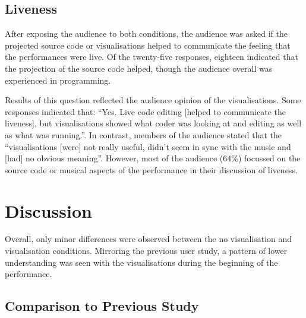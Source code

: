 \subsection{Liveness}

After exposing the audience to both conditions, the audience was asked if the projected source code or visualisations helped to communicate the feeling that the performances were live. Of the twenty-five responses, eighteen indicated that the projection of the source code helped, though the audience overall was experienced in programming. 

Results of this question reflected the audience opinion of the visualisations. Some responses indicated that: ``Yes. Live code editing [helped to communicate the liveness], but visualisations showed what coder was looking at and editing as well as what was running.''. In contrast, members of the audience stated that the ``visualisations [were] not really useful, didn't seem in sync with the music and [had] no obvious meaning''. However, most of the audience ($64\%$) focussed on the source code or musical aspects of the performance in their discussion of liveness.

\section{Discussion}

Overall, only minor differences were observed between the no visualisation and visualisation conditions. Mirroring the previous user study, a pattern of lower understanding was seen with the visualisations during the beginning of the performance. 

\more





\subsection{Comparison to Previous Study}

\more



